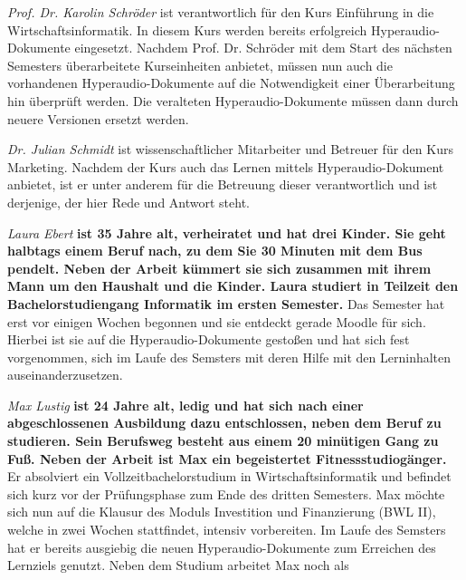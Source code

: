 \par
\begingroup
\leftskip=1cm
\rightskip=1.5cm
\noindent

{\Large\emph{Prof. Dr. Karolin Schröder}} ist verantwortlich für den Kurs \glqq Einführung in die Wirtschaftsinformatik\grqq{}. In diesem Kurs werden bereits erfolgreich Hyperaudio-Dokumente eingesetzt. Nachdem Prof. Dr. Schröder mit dem Start des nächsten Semesters überarbeitete Kurseinheiten anbietet, müssen nun auch die vorhandenen Hyperaudio-Dokumente auf die Notwendigkeit einer Überarbeitung hin überprüft werden. Die veralteten Hyperaudio-Dokumente müssen dann durch neuere Versionen ersetzt werden.
\vspace{.5cm}

{\Large\emph{Dr. Julian Schmidt}} ist wissenschaftlicher Mitarbeiter und Betreuer für den Kurs \glqq Marketing\grqq{}. Nachdem der Kurs auch das Lernen mittels Hyperaudio-Dokument anbietet, ist er unter anderem für die Betreuung dieser verantwortlich und ist derjenige, der hier Rede und Antwort steht.
\vspace{.5cm}

{\Large\emph{Laura Ebert}} \textbf{ist 35 Jahre alt, verheiratet und hat drei Kinder. Sie geht halbtags einem Beruf nach, zu dem Sie 30 Minuten mit dem Bus pendelt. Neben der Arbeit kümmert sie sich zusammen mit ihrem Mann um den Haushalt und die Kinder. Laura studiert in Teilzeit den Bachelorstudiengang Informatik im ersten Semester.} Das Semester hat erst vor einigen Wochen begonnen und sie entdeckt gerade Moodle für sich. Hierbei ist sie auf die Hyperaudio-Dokumente gestoßen und hat sich fest vorgenommen, sich im Laufe des Semsters mit deren Hilfe mit den Lerninhalten auseinanderzusetzen.
\vspace{.5cm}
 
{\Large\emph{Max Lustig}} \textbf{ist 24 Jahre alt, ledig und hat sich nach einer abgeschlossenen Ausbildung dazu entschlossen, neben dem Beruf zu studieren. Sein Berufsweg besteht aus einem 20 minütigen Gang zu Fuß. Neben der Arbeit ist Max ein begeistertet Fitnessstudiogänger.} Er absolviert ein Vollzeitbachelorstudium in Wirtschaftsinformatik und befindet sich kurz vor der Prüfungsphase zum Ende des dritten Semesters. Max möchte sich nun auf die Klausur des Moduls \glqq Investition und Finanzierung (BWL II)\grqq{}, welche in zwei Wochen stattfindet, intensiv vorbereiten. Im Laufe des Semsters hat er bereits ausgiebig die neuen Hyperaudio-Dokumente zum Erreichen des Lernziels genutzt. Neben dem Studium arbeitet Max noch als 

